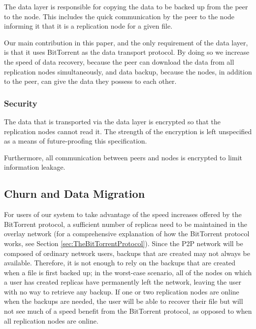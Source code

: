 \documentclass[12pt]{report}
\begin{document}
The data layer is responsible for copying the data to be backed up from the peer to the node. This includes the quick communication by the peer to the node informing it that it is a replication node for a given file.

Our main contribution in this paper, and the only requirement of the data layer, is that it uses BitTorrent as the data transport protocol. By doing so we increase the speed of data recovery, because the peer can download the data from all replication nodes simultaneously, and data backup, because the nodes, in addition to the peer, can give the data they possess to each other.

\subsubsection{Security}

The data that is transported via the data layer is encrypted so that the replication nodes cannot read it. The strength of the encryption is left unspecified as a means of future-proofing this specification.

Furthermore, all communication between peers and nodes is encrypted to limit information leakage.

\subsection{Churn and Data Migration} \label{sec:ChurnandDataMigration_DataExchange}

For users of our system to take advantage of the speed increases offered by the BitTorrent protocol, a sufficient number of replicas need to be maintained in the overlay network (for a comprehensive explanation of how the BitTorrent protocol works, see Section \ref{sec:TheBitTorrentProtocol}). Since the P2P network will be composed of ordinary network users, backups that are created may not always be available. Therefore, it is not enough to rely on the backups that are created when a file is first backed up; in the worst-case scenario, all of the nodes on which a user has created replicas have permanently left the network, leaving the user with no way to retrieve any backup. If one or two replication nodes are online when the backups are needed, the user will be able to recover their file but will not see much of a speed benefit from the BitTorrent protocol, as opposed to when all replication nodes are online.
\end{document}
